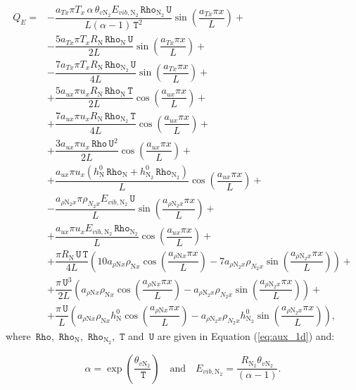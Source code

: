\documentclass[10pt]{article}
\newcommand{\Rho}{\,\mathtt{Rho}}
\newcommand{\T}{\,\mathtt{T}}
\newcommand{\U}{\,\mathtt{U}}
\begin{document}
\begin{equation}
\begin{split}
 Q_E = &-\dfrac{a_{Tx} \pi T_x \,\alpha\, \theta_{v \text{N}_2} E_{vib, \text{N}_2} \Rho_{\text{N}_2} \U }{L (\alpha-1) \T^2}\sin\left(\dfrac{a_{Tx} \pi x}{L}\right)+\\
&- \dfrac{5a_{Tx} \pi T_x R_\text{N} \Rho_\text{N} \U }{2L}\sin\left(\dfrac{a_{Tx} \pi x}{L}\right)+\\
&- \dfrac{7a_{Tx} \pi T_x R_\text{N} \Rho_{\text{N}_2} \U }{4L}\sin\left(\dfrac{a_{Tx} \pi x}{L}\right)+\\
&+ \dfrac{5a_{ux} \pi u_x R_\text{N} \Rho_\text{N} \T }{2L}\cos\left(\dfrac{a_{ux} \pi x}{L}\right)+\\
&+ \dfrac{7a_{ux} \pi u_x R_\text{N} \Rho_{\text{N}_2} \T }{4L}\cos\left(\dfrac{a_{ux} \pi x}{L}\right)+\\
&+ \dfrac{3a_{ux} \pi u_x \Rho \U^2 }{2L}\cos\left(\dfrac{a_{ux} \pi x}{L}\right)+\\
&+\dfrac{a_{ux} \pi u_x (h^0_{\text{N}} \Rho_\text{N} +h^0_{\text{N}_2} \Rho_{\text{N}_2})}{L}\cos\left(\dfrac{a_{ux} \pi x}{L}\right)+\\
&-\dfrac{a_{ \rho \text{N}_2 x} \pi \rho_{N_2 x} E_{vib, \text{N}_2} \U }{L}\sin\left(\dfrac{a_{ \rho \text{N}_2 x} \pi x}{L}\right)+\\
&+\dfrac{a_{ux} \pi u_x E_{vib, \text{N}_2} \Rho_{\text{N}_2} }{L}\cos\left(\dfrac{a_{ux} \pi x}{L}\right)+\\
&+\dfrac{\pi R_\text{N} \U \T}{4L}\left(10 a_{ \rho \text{N} x} \rho_{\text{N}x} \cos\left(\dfrac{a_{ \rho \text{N} x} \pi x}{L}\right)-7 a_{ \rho \text{N}_2 x} \rho_{N_2 x} \sin\left(\dfrac{a_{ \rho \text{N}_2 x} \pi x}{L}\right)\right) +\\
&+\dfrac{\pi \U^3}{2L}\left(a_{ \rho \text{N} x} \rho_{\text{N}x} \cos\left(\dfrac{a_{ \rho \text{N} x} \pi x}{L}\right)-a_{ \rho \text{N}_2 x} \rho_{N_2 x} \sin\left(\dfrac{a_{ \rho \text{N}_2 x} \pi x}{L}\right)\right) +\\
&+\dfrac{\pi \U}{L}\left(a_{ \rho \text{N} x} \rho_{\text{N}x} h^0_{\text{N}} \cos\left(\dfrac{a_{ \rho \text{N} x} \pi x}{L}\right)-a_{ \rho \text{N}_2 x} \rho_{N_2 x} h^0_{\text{N}_2} \sin\left(\dfrac{a_{ \rho \text{N}_2 x} \pi x}{L}\right)\right),
\end{split}
\end{equation}
where $\Rho,\,\Rho_{\text{N}},\,\Rho_{\text{N}_2},\, \T$ and $\U$ are given  in Equation (\ref{eq:aux_1d}) and:

$$\alpha = \exp\left(\dfrac{\theta_{v \text{N}_2}}{\T}\right)\quad \mbox{and} \quad  E_{vib, \text{N}_2} = \dfrac{R_{\text{N}_2} \theta_{v \text{N}_2}}{(\alpha-1)}.$$
\end{document}

